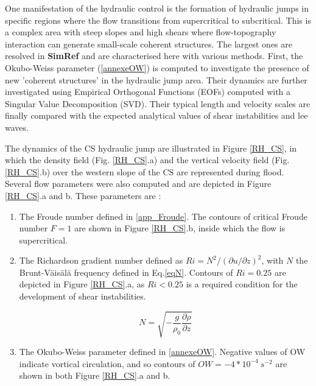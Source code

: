One manifestation of the hydraulic control is the formation of hydraulic jumps in specific regions where the flow transitions from supercritical to subcritical. This is a complex area with steep slopes and high shears where flow-topography interaction can generate small-scale coherent structures. The largest ones are resolved in \textbf{SimRef} and are characterised here with various methods. First, the Okubo-Weiss parameter (\ref{annexeOW}) is computed to investigate the presence of new 'coherent structures' in the hydraulic jump area. Their dynamics are further investigated using Empirical Orthogonal Functions (EOFs) computed with a Singular Value Decomposition (SVD). Their typical length and velocity scales are finally compared with the expected analytical values of shear instabilities and lee waves.

The dynamics of the CS hydraulic jump are illustrated in Figure \ref{RH_CS}, in which the density field (Fig. \ref{RH_CS}.a) and the vertical velocity field (Fig. \ref{RH_CS}.b) over the western slope of the CS are represented during flood. Several flow parameters were also computed and are depicted in Figure \ref{RH_CS}.a and b. These parameters are :

\begin{enumerate}

\item
The Froude number defined in \ref{app_Froude}. The contours of critical Froude number $F=1$ are shown in Figure \ref{RH_CS}.b, inside which the flow is supercritical.

\item
The Richardson gradient number defined as $Ri =  N^2 / \left({\partial u}/{\partial z}\right)^2$, with $N$ the Brunt-V\"ais\"al\"a frequency defined in Eq.\ref{eqN}. Contours of $Ri = 0.25$ are depicted in Figure \ref{RH_CS}.a, as $Ri<0.25$ is a required condition for the development of shear instabilities.

\begin{equation}
N=\sqrt{ - \frac{g}{\rho_0} \frac{\partial \rho}{\partial z}}
\label{eqN}
\end{equation}

\item
The Okubo-Weiss parameter defined in \ref{annexeOW}. Negative values of OW indicate vortical circulation, and so contours of $OW = -4*10^{-4}\ s^{-2}$ are shown in both Figure \ref{RH_CS}.a and b. 

\end{enumerate}

